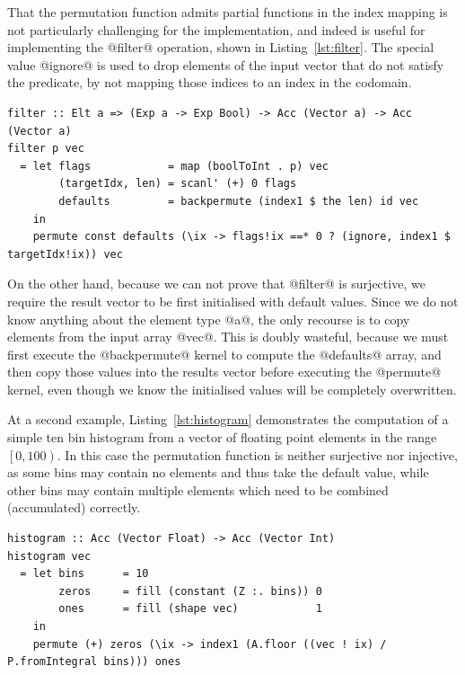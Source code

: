 That the permutation function admits partial functions in the index mapping is
not particularly challenging for the implementation, and indeed is useful for
implementing the @filter@ operation, shown in Listing~\ref{lst:filter}. The
special value @ignore@ is used to drop elements of the input vector that do not
satisfy the predicate, by not mapping those indices to an index in the codomain.
%
\begin{lstlisting}[style=haskell_float
    ,label=lst:filter
    ,caption={[Filter in Accelerate] Filtering returns only those elements of a
    vector which satisfy a predicate. This operation is included as part of
    Accelerate's standard prelude.}]
filter :: Elt a => (Exp a -> Exp Bool) -> Acc (Vector a) -> Acc (Vector a)
filter p vec
  = let flags            = map (boolToInt . p) vec
        (targetIdx, len) = scanl' (+) 0 flags
        defaults         = backpermute (index1 $ the len) id vec
    in
    permute const defaults (\ix -> flags!ix ==* 0 ? (ignore, index1 $ targetIdx!ix)) vec
\end{lstlisting}

On the other hand, because we can not prove that @filter@ is surjective, we
require the result vector to be first initialised with default values. Since we
do not know anything about the element type @a@, the only recourse is to
copy elements from the input array @vec@. This is doubly wasteful, because
we must first execute the @backpermute@ kernel to compute the
@defaults@ array, and then copy those values into the results vector before
executing the @permute@ kernel, even though we know the initialised values
will be completely overwritten.

At a second example, Listing~\ref{lst:histogram} demonstrates the computation of
a simple ten bin histogram from a vector of floating point elements in the range
$\left[ 0, 100 \right)$. In this case the permutation function is neither
surjective nor injective, as some bins may contain no elements and thus take the
default value, while other bins may contain multiple elements which need to be
combined (accumulated) correctly.
%
\begin{lstlisting}[style=haskell_float
    ,label=lst:histogram
    ,caption={[Simple histogram in Accelerate] A simple histogram written in
    Accelerate. We assume the input vector contains elements in the range
    $\left[0,100\right)$ and accumulate into ten equally sized bins.}]
histogram :: Acc (Vector Float) -> Acc (Vector Int)
histogram vec
  = let bins      = 10
        zeros     = fill (constant (Z :. bins)) 0
        ones      = fill (shape vec)            1
    in
    permute (+) zeros (\ix -> index1 (A.floor ((vec ! ix) / P.fromIntegral bins))) ones
\end{lstlisting}

